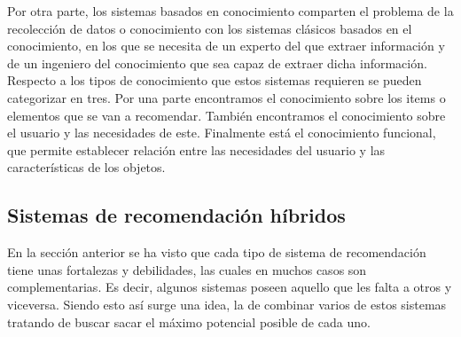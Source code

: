 Por otra parte, los sistemas basados en conocimiento comparten el problema de la recolección de datos o conocimiento con los sistemas clásicos basados en el conocimiento, en los que se necesita de un experto del que extraer información y de un ingeniero del conocimiento que sea capaz de extraer dicha información. Respecto a los tipos de conocimiento que estos sistemas requieren se pueden categorizar en tres. Por una parte encontramos el conocimiento sobre los items o elementos que se van a recomendar. También encontramos el conocimiento sobre el usuario y las necesidades de este. Finalmente está el conocimiento funcional, que permite establecer relación entre las necesidades del usuario y las características de los objetos.

\subsection{Sistemas de recomendación híbridos}

En la sección anterior se ha visto que cada tipo de sistema de recomendación tiene unas fortalezas y debilidades, las cuales en muchos casos son complementarias. Es decir, algunos sistemas poseen aquello que les falta a otros y viceversa. Siendo esto así surge una idea, la de combinar varios de estos sistemas tratando de buscar sacar el máximo potencial posible de cada uno.


